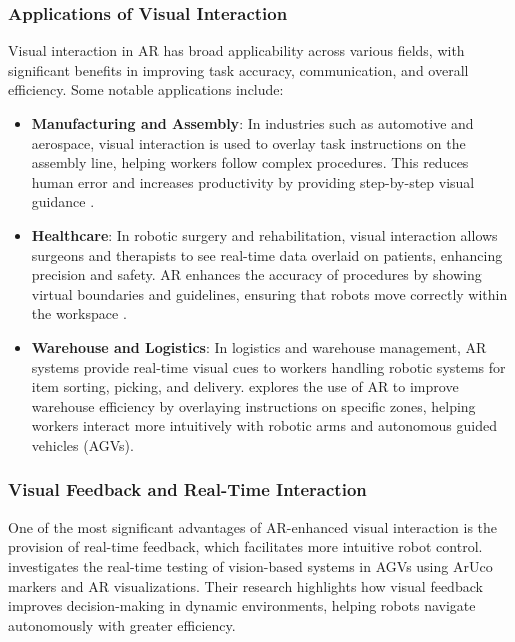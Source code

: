 \subsubsection{Applications of Visual Interaction}

Visual interaction in AR has broad applicability across various fields, with significant benefits in improving task accuracy, communication, and overall efficiency. Some notable applications include:
\begin{itemize}
    \item \textbf{Manufacturing and Assembly}: In industries such as automotive and aerospace, visual interaction is used to overlay task instructions on the assembly line, helping workers follow complex procedures. This reduces human error and increases productivity by providing step-by-step visual guidance \cite{Daponte2020}.
    \item \textbf{Healthcare}: In robotic surgery and rehabilitation, visual interaction allows surgeons and therapists to see real-time data overlaid on patients, enhancing precision and safety. AR enhances the accuracy of procedures by showing virtual boundaries and guidelines, ensuring that robots move correctly within the workspace \cite{Husar2022}.
    \item \textbf{Warehouse and Logistics}: In logistics and warehouse management, AR systems provide real-time visual cues to workers handling robotic systems for item sorting, picking, and delivery. \cite{Husar2022} explores the use of AR to improve warehouse efficiency by overlaying instructions on specific zones, helping workers interact more intuitively with robotic arms and autonomous guided vehicles (AGVs).
\end{itemize}

\subsubsection{Visual Feedback and Real-Time Interaction}

One of the most significant advantages of AR-enhanced visual interaction is the provision of real-time feedback, which facilitates more intuitive robot control. \cite{Filus2023} investigates the real-time testing of vision-based systems in AGVs using ArUco markers and AR visualizations. Their research highlights how visual feedback improves decision-making in dynamic environments, helping robots navigate autonomously with greater efficiency.

